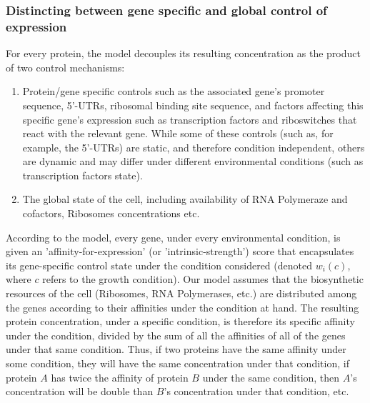 \documentclass[notitlepage]{article}
\begin{document}
\subsubsection{Distincting between gene specific and global control of expression}
For every protein, the model decouples its resulting concentration as the product of two control mechanisms:
\begin{enumerate}
\item Protein/gene specific controls such as the associated gene's promoter sequence, 5'-UTRs, ribosomal binding site sequence, and factors affecting this specific gene's expression such as transcription factors and riboswitches that react with the relevant gene.
  While some of these controls (such as, for example, the 5'-UTRs) are static, and therefore condition independent, others are dynamic and may differ under different environmental conditions (such as transcription factors state).
\item The global state of the cell, including availability of RNA Polymeraze and cofactors, Ribosomes concentrations etc.
\end{enumerate}
According to the model, every gene, under every environmental condition, is given an 'affinity-for-expression' (or 'intrinsic-strength') score that encapsulates its gene-specific control state under the condition considered (denoted $w_i(c)$, where $c$ refers to the growth condition).
Our model assumes that the biosynthetic resources of the cell (Ribosomes, RNA Polymerases, etc.) are distributed among the genes according to their affinities under the condition at hand.
The resulting protein concentration, under a specific condition, is therefore its specific affinity under the condition, divided by the sum of all the affinities of all of the genes under that same condition.
Thus, if two proteins have the same affinity under some condition, they will have the same concentration under that condition, if protein $A$ has twice the affinity of protein $B$ under the same condition, then $A$'s concentration will be double than $B$'s concentration under that condition, etc.
\end{document}
